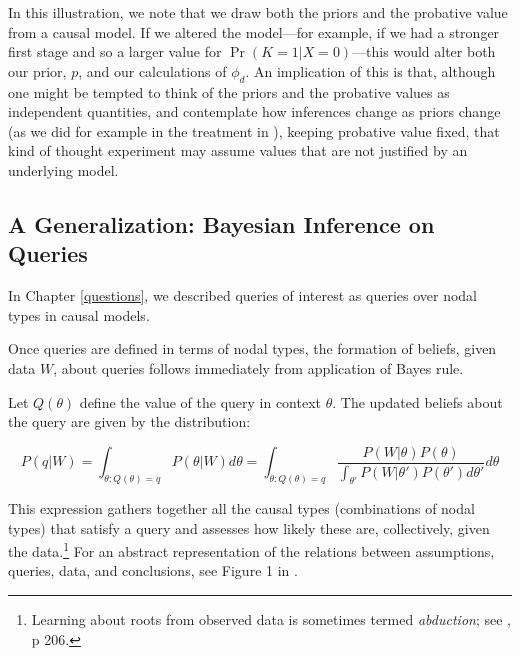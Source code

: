 \documentclass[
  12pt,
]{book}
\begin{document}
In this illustration, we note that we draw both the priors and the probative value from a causal model. If we altered the model---for example, if we had a stronger first stage and so a larger value for \(\Pr(K=1|X=0)\)---this would alter both our prior, \(p\), and our calculations of \(\phi_d\). An implication of this is that, although one might be tempted to think of the priors and the probative values as independent quantities, and contemplate how inferences change as priors change (as we did for example in the treatment in \citet{humphreys2015mixing}), keeping probative value fixed, that kind of thought experiment may assume values that are not justified by an underlying model.

\hypertarget{a-generalization-bayesian-inference-on-queries}{%
\subsection{A Generalization: Bayesian Inference on Queries}\label{a-generalization-bayesian-inference-on-queries}}

In Chapter \ref{questions}, we described queries of interest as queries over nodal types in causal models.

Once queries are defined in terms of nodal types, the formation of beliefs, given data \(W\), about queries follows immediately from application of Bayes rule.

Let \(Q(\theta)\) define the value of the query in context \(\theta\). The updated beliefs about the query are given by the distribution:

\[P(q | W) = \int_{\theta:Q(\theta) = q} P(\theta|W)d\theta =  \int_{\theta:Q(\theta) = q} \frac{P(W|\theta)P(\theta)}{\int_{\theta'}P(W|\theta')P(\theta')d\theta'}d\theta\]

This expression gathers together all the causal types (combinations of nodal types) that satisfy a query and assesses how likely these are, collectively, given the data.\footnote{Learning about roots from observed data is sometimes termed \emph{abduction}; see \citet{pearl2009causality}, p 206.} For an abstract representation of the relations between assumptions, queries, data, and conclusions, see Figure 1 in \citet{pearl2012causal}.
\end{document}
